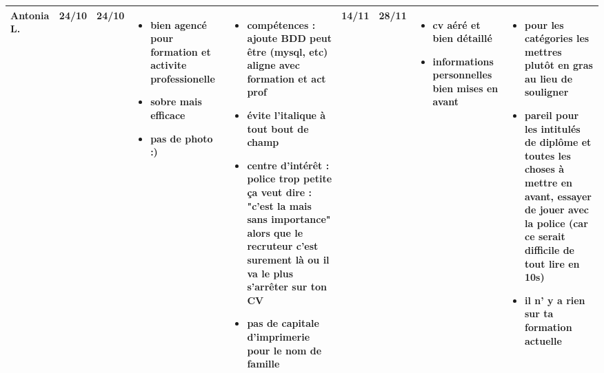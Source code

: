 \documentclass[a4paper,11pt]{article}
\begin{document}
\begin{landscape}
\begin{longtable}{|l|l|l|p{4cm}|p{4cm}|l|l|p{4cm}|p{4cm}|}
    Antonia L. 	& 24/10 & 24/10 
				& \begin{itemize}
				  \item bien agencé pour formation et activite professionelle
				  \item sobre mais efficace
				  \item pas de photo :)
				  \end{itemize}
				& \begin{itemize}
				  \item compétences : ajoute BDD peut être (mysql, etc) aligne avec formation et act prof
				  \item évite l'italique à tout bout de champ
				  \item centre d'intérêt : police trop petite ça veut dire  : "c'est la mais sans importance" alors que le recruteur c'est surement là ou il va le plus s’arrêter sur ton CV
				  \item pas de capitale d'imprimerie pour le nom de famille
				  \end{itemize}
				& 14/11 & 28/11
				& \begin{itemize}
				  \item cv aéré et bien détaillé
				  \item informations personnelles bien mises en avant
				  \end{itemize}
				& \begin{itemize}
				  \item pour les catégories les mettres plutôt en gras au lieu de souligner
				  \item pareil pour les intitulés de diplôme et toutes les choses à mettre en avant, essayer de jouer avec la police (car ce serait difficile de tout lire en 10s)
				  \item il n' y a rien sur ta formation actuelle
				  \end{itemize} \\ \hline


\end{longtable}
\end{landscape}
\end{document}

